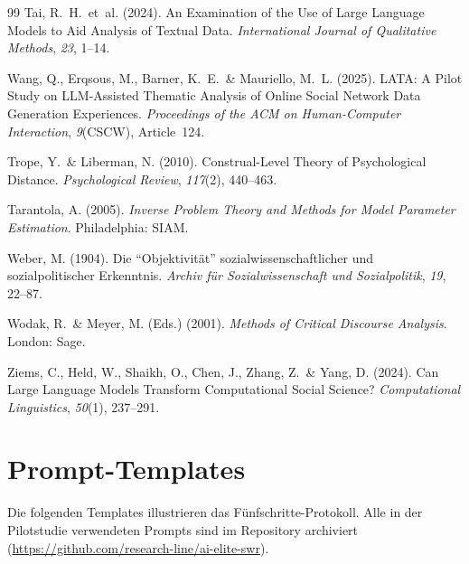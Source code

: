 \documentclass[11pt,a4paper]{article}
\begin{document}
\begin{thebibliography}{99}
  Tai, R.~H.~et~al. (2024).
  An Examination of the Use of Large Language Models to Aid Analysis of Textual Data.
  \textit{International Journal of Qualitative Methods}, \textit{23}, 1--14.

  Wang, Q., Erqsous, M., Barner, K.~E.~\& Mauriello, M.~L. (2025).
  LATA: A Pilot Study on LLM-Assisted Thematic Analysis of Online Social Network Data Generation Experiences.
  \textit{Proceedings of the ACM on Human-Computer Interaction}, \textit{9}(CSCW), Article~124.

  Trope, Y.~\& Liberman, N. (2010).
  Construal-Level Theory of Psychological Distance.
  \textit{Psychological Review}, \textit{117}(2), 440--463.

  Tarantola, A. (2005).
  \textit{Inverse Problem Theory and Methods for Model Parameter Estimation}.
  Philadelphia: SIAM.

  Weber, M. (1904).
  Die ``Objektivit\"at'' sozialwissenschaftlicher und sozialpolitischer Erkenntnis.
  \textit{Archiv f\"ur Sozialwissenschaft und Sozialpolitik}, \textit{19}, 22--87.

  Wodak, R.~\& Meyer, M. (Eds.) (2001).
  \textit{Methods of Critical Discourse Analysis}.
  London: Sage.

  Ziems, C., Held, W., Shaikh, O., Chen, J., Zhang, Z.~\& Yang, D. (2024).
  Can Large Language Models Transform Computational Social Science?
  \textit{Computational Linguistics}, \textit{50}(1), 237--291.

\end{thebibliography}


\newpage
\appendix

\section{Prompt-Templates}
\label{app:prompts}

Die folgenden Templates illustrieren das F\"unfschritte-Protokoll. Alle in der Pilotstudie verwendeten Prompts sind im Repository archiviert (\url{https://github.com/research-line/ai-elite-swr}).
\end{document}
